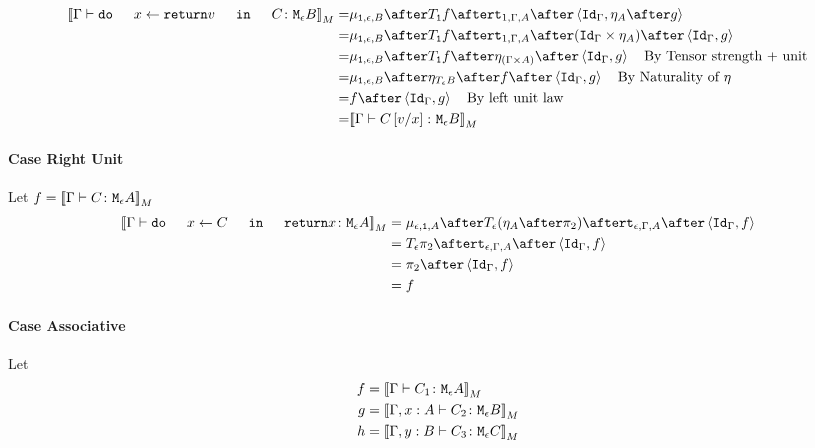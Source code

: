 \documentclass{report}
\begin{document}
    \begin{equation}
        \begin{split}
            \deno{\gtyperelation{\doin{x}{\return{v}}{C}}{\meb}} = &  \bind{\1}{\e}{B} \after \T{\1}{f} \after \tstrength{1}{\G}{A} \after \pr{\idg}{\point{A}\after g} \\
            = & \bind{\1}{\e}{B} \after \T{\1}{f} \after \tstrength{1}{\G}{A} \after (\idg\times \point{A}) \after \pr{\idg}{g} \\
            = & \bind{\1}{\e}{B} \after \T{\1}{f} \after \point{(\G \times A)} \after \pr{\idg}{g} \quad\text{By Tensor strength + unit}\\
            = & \bind{\1}{\e}{B}\after\point{\teb}\after f\after\pr{\idg}{g} \quad\text{By Naturality of $\point{}$}\\
            = & f\after\pr{\idg}{g} \quad\text{By left unit law}\\
            = & \deno{\gtyperelation{C\ssub{x}{v}}{\meb}}\\
        \end{split}
    \end{equation}


    

    \paragraph{Case Right Unit}
    
    Let $f = {\bf [\![}\Gamma \vdash C \colon \texttt{M}_{\epsilon}{A}{\bf ]\!]}_M$ 
        \begin{equation}
        \begin{split}
            \deno{\gtyperelation{\doin{x}{C}{\return{x}}}{\mea}}  & = \bind{\e}{\1}{A} \after \T{\e}{(\point{A} \after \pp)} \after \tstrength{\e}{\G}{A}\after \pr{\idg}{f} \\
            & = \T{\e}{\pp} \after \tstrength{\e}{\G}{A} \after \pr {\idg}{f} \\
            & = \pp \after \pr{\idg}{f}\\
            & = f
        \end{split}
    \end{equation}
    
    

    \paragraph{Case Associative}
    Let
    \begin{align}
        f ={}& {\bf [\![}\Gamma \vdash C_1 \colon \texttt{M}_{\epsilon}{A}{\bf ]\!]}_M\\
        g ={}& {\bf [\![}\Gamma, x: A \vdash C_2 \colon \texttt{M}_{\epsilon}{B}{\bf ]\!]}_M\\
        h ={}& {\bf [\![}\Gamma, y: B \vdash C_3 \colon \texttt{M}_{\epsilon}{C}{\bf ]\!]}_M
    \end{align}
\end{document}
